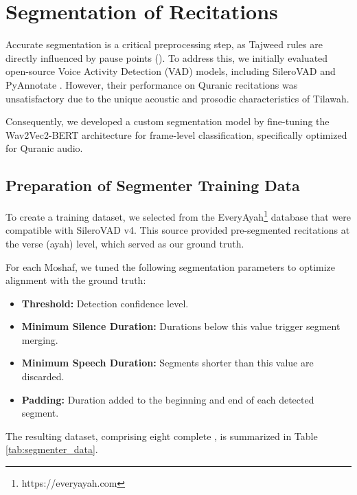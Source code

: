 \section{Segmentation of Recitations}

Accurate segmentation is a critical preprocessing step, as Tajweed rules are directly influenced by pause points (). To address this, we initially evaluated open-source Voice Activity Detection (VAD) models, including SileroVAD \cite{SileroVAD} and PyAnnotate \cite{Plaquet23}. However, their performance on Quranic recitations was unsatisfactory due to the unique acoustic and prosodic characteristics of Tilawah.

Consequently, we developed a custom segmentation model by fine-tuning the Wav2Vec2-BERT architecture \cite{barrault2023seamless} for frame-level classification, specifically optimized for Quranic audio.

\subsection{Preparation of Segmenter Training Data}

To create a training dataset, we selected  from the EveryAyah\footnote{https://everyayah.com} database that were compatible with SileroVAD v4. This source provided pre-segmented recitations at the verse (ayah) level, which served as our ground truth.

For each Moshaf, we tuned the following segmentation parameters to optimize alignment with the ground truth:
\begin{itemize}
\item \textbf{Threshold:} Detection confidence level.
\item \textbf{Minimum Silence Duration:} Durations below this value trigger segment merging.
\item \textbf{Minimum Speech Duration:} Segments shorter than this value are discarded.
\item \textbf{Padding:} Duration added to the beginning and end of each detected segment.
\end{itemize}

The resulting dataset, comprising eight complete , is summarized in Table \ref{tab:segmenter_data}.

